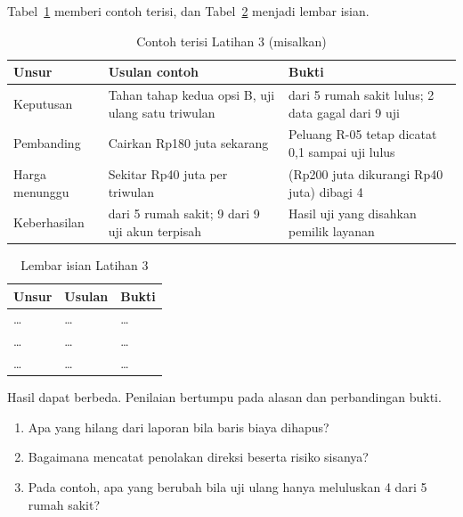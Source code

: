 Tabel~\ref{tab:ch13-lat3-contoh} memberi contoh terisi, dan Tabel~\ref{tab:ch13-lat3-hasil} menjadi
lembar isian.

\begin{table}[!htb]
  \centering\small
  \caption{Contoh terisi Latihan 3 (misalkan)}\label{tab:ch13-lat3-contoh}
  \begin{tabularx}{\textwidth}{|>{\raggedright\arraybackslash}p{}|>{\raggedright\arraybackslash}X|>{\raggedright\arraybackslash}X|}
    \hline
    \textbf{Unsur} & \textbf{Usulan contoh} & \textbf{Bukti} \\ \hline
    Keputusan & Tahan tahap kedua opsi B, uji ulang satu triwulan & 3 dari 5 rumah sakit lulus; 2
    data gagal dari 9 uji \\ \hline
    Pembanding & Cairkan Rp180 juta sekarang & Peluang R-05 tetap dicatat 0,1 sampai uji lulus \\
    \hline
    Harga menunggu & Sekitar Rp40 juta per triwulan & (Rp200 juta dikurangi Rp40 juta) dibagi 4 \\
    \hline
    Keberhasilan & 5 dari 5 rumah sakit; 9 dari 9 uji akun terpisah & Hasil uji yang disahkan
    pemilik layanan \\ \hline
  \end{tabularx}
\end{table}

\begin{table}[!htb]
  \centering\small
  \caption{Lembar isian Latihan 3}\label{tab:ch13-lat3-hasil}
  \begin{tabularx}{\textwidth}{|>{\raggedright\arraybackslash}p{}|>{\raggedright\arraybackslash}X|>{\raggedright\arraybackslash}X|}
    \hline
    \textbf{Unsur} & \textbf{Usulan} & \textbf{Bukti} \\ \hline
    \dots & \dots & \dots \\ \hline
    \dots & \dots & \dots \\ \hline
    \dots & \dots & \dots \\ \hline
  \end{tabularx}
\end{table}

Hasil dapat berbeda. Penilaian bertumpu pada alasan dan perbandingan bukti.
\begin{enumerate}
  \item Apa yang hilang dari laporan bila baris biaya dihapus?
  \item Bagaimana mencatat penolakan direksi beserta risiko sisanya?
  \item Pada contoh, apa yang berubah bila uji ulang hanya meluluskan 4 dari 5 rumah sakit?
\end{enumerate}
